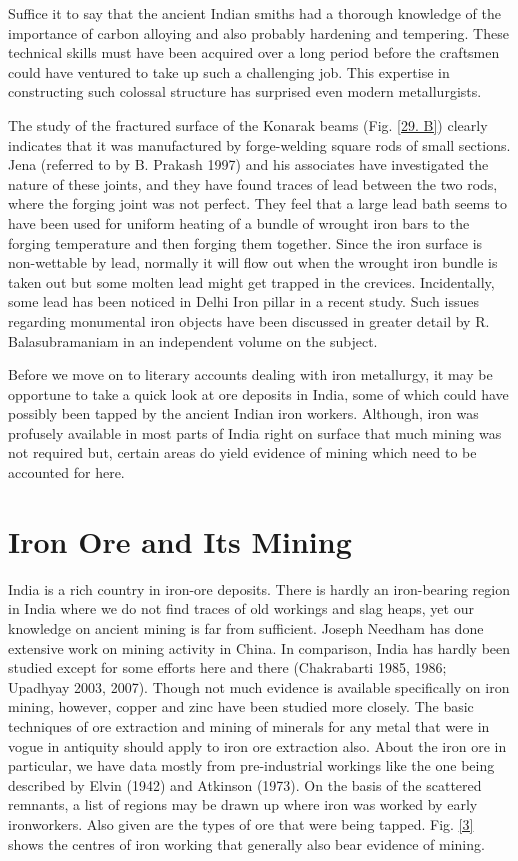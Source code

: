 Suffice it to say that the ancient Indian smiths had a thorough knowledge of the importance of carbon alloying and also probably hardening and tempering. These technical skills must have been acquired over a long period before the craftsmen could have ventured to take up such a challenging job. This expertise in constructing such colossal structure has surprised even modern metallurgists. 

The study of the fractured surface of the Konarak beams (Fig. \ref{29. B}) clearly indicates that it was manufactured by forge-welding square rods of small sections. Jena (referred to by B. Prakash 1997) and his associates have investigated the nature of these joints, and they have found traces of lead between the two rods, where the forging joint was not perfect. They feel that a large lead bath seems to have been used for uniform heating of a bundle of wrought iron bars to the forging temperature and then forging them together. Since the iron surface is non-wettable by lead, normally it will flow out when the wrought iron bundle is taken out but some molten lead might get trapped in the crevices. Incidentally, some lead has been noticed in Delhi Iron pillar in a recent study. Such issues regarding monumental iron objects have been discussed in greater detail by R. Balasubramaniam in an independent volume on the subject. 

Before we move on to literary accounts dealing with iron metallurgy, it may be opportune to take a quick look at ore deposits in India, some of which could have possibly been tapped by the ancient Indian iron workers. Although, iron was profusely available in most parts of India right on surface that much mining was not required but, certain areas do yield evidence of mining which need to be accounted for here.

\vspace{-.3cm}

\section*{Iron Ore and Its Mining}\label{chapter4-section-2}

India is a rich country in iron-ore deposits. There is hardly an iron-bearing region in India where we do not find traces of old workings and slag heaps, yet our knowledge on ancient mining is far from sufficient. Joseph Needham has done extensive work on mining activity in China. In comparison, India has hardly been studied except for some efforts here and there (Chakrabarti 1985, 1986; Upadhyay 2003, 2007). Though not much evidence is available specifically on iron mining, however, copper and zinc have been studied more closely. The basic techniques of ore extraction and mining of minerals for any metal that were in vogue in antiquity should apply to iron ore extraction also. About the iron ore in particular, we have data mostly from pre-industrial workings like the one being described by Elvin (1942) and Atkinson (1973). On the basis of the scattered remnants, a list of regions may be drawn up where iron was worked by early ironworkers. Also given are the types of ore that were being tapped. Fig. \ref{3} shows the centres of iron working that generally also bear evidence of mining.

